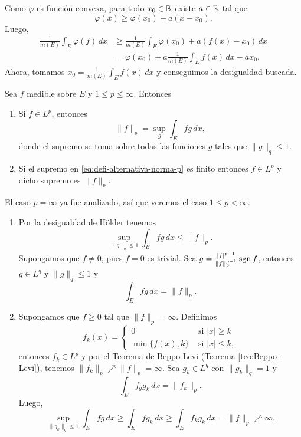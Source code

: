 \begin{demo}
Como $\varphi$ es funci\'on convexa, para todo $x_0\in \mathbb{R}$ existe $a\in \mathbb{R}$ tal que 
\[
\varphi(x)\geq \varphi(x_0)+a(x-x_0).
\]
Luego,
\[
\begin{split}
\frac{1}{m(E)} \int_E \varphi(f)\,dx &\geq 
\frac{1}{m(E)}\int_E \varphi(x_0)+a(f(x)-x_0)\,dx
\\
&=\varphi(x_0)+a\frac{1}{m(E)}\int_E f(x)\,dx -ax_0.
\end{split}
\]
Ahora, tomamos $x_0=\frac{1}{m(E)} \int_E f(x)\,dx$ y  conseguimos la desigualdad buscada.
\end{demo}

\begin{teorema}{}
Sea $f$ medible sobre $E$ y $1\leq p\leq \infty$.
Entonces
\begin{enumerate}
    \item Si $f \in L^p$, entonces 
   \begin{equation}\label{eq:defi-alternativa-norma-p}
        \|f \|_p=\sup\limits_{g} \int_E fg\, dx,
   \end{equation}
   donde el supremo se toma sobre todas las funciones $g$ tales que
   $\|g\|_q\leq 1$.
   \item Si el supremo en \eqref{eq:defi-alternativa-norma-p} es finito entonces  $f \in L^p$ y dicho supremo es $\|f \|_p$.
   \end{enumerate}
\end{teorema}

\begin{demo}
El caso $p=\infty$ ya fue analizado, as\'i que veremos el caso $1\leq p<\infty$.
\begin{enumerate}
    \item Por la desigualdad de H\"older tenemos
    \[\sup\limits_{\|g\|_q\leq 1} \int_E fg\,dx \leq \|f\|_p.\]
    Supongamos que $f \neq 0$, pues $f=0$ es trivial.
    Sea $g= \frac{|f|^{p-1}}{\|f\|_p^{p-1}} \operatorname{sgn} f$, entonces
    $g \in L^q$ y $\|g\|_q\leq 1$ y 
    \[ \int_E fg\, dx=\|f\|_p. \]
    \item Supongamos que $f\geq 0$ tal que $\|f\|_p=\infty.$
    Definimos 
    \[
    f_k(x)=\left\{
    \begin{array}{ll}
       0  &    \mbox{ si } |x|\geq k
       \\
    \min\{f(x),k\}     &  \mbox{ si } |x|\leq k,
    \end{array}
    \right.
    \]    
    entonces $f_k \in L^p$ y por el Teorema de Beppo-Levi (Teorema \ref{teo:Beppo-Levi}), tenemos
    $\|f_k\|_p \nearrow \|f\|_p=\infty. $
    Sea  $g_k\in L^q$ con $\|g_k\|_q=1$ y 
    \[
    \int_E f_g g_k\, dx=\|f_k\|_p.
    \] 
    Luego, 
    \[
    \sup\limits_{\|g_k\|_q\leq 1} \int_E fg\,dx \geq 
    \int_E fg_k\,dx \geq \int_E f_k g_k \,dx=\|f\|_p \nearrow\infty.
    \]
        \end{enumerate}
\end{demo}


